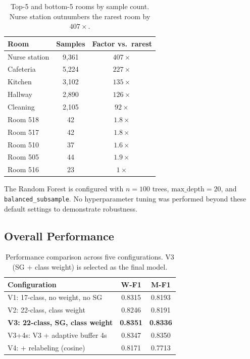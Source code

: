 \documentclass{iopconfser}
\begin{document}
\begin{table}[h]
\centering
\caption{Top-5 and bottom-5 rooms by sample count. Nurse station outnumbers the rarest room by $407\times$.}
\label{tab:imbalance}
\begin{tabular}{lcc}
\toprule
\textbf{Room} & \textbf{Samples} & \textbf{Factor vs.\ rarest} \\
\midrule
Nurse station & 9,361 & $407\times$ \\
Cafeteria     & 5,224 & $227\times$ \\
Kitchen       & 3,102 & $135\times$ \\
Hallway       & 2,890 & $126\times$ \\
Cleaning      & 2,105 & $92\times$  \\
\addlinespace
Room 518      & 42    & $1.8\times$ \\
Room 517      & 42    & $1.8\times$ \\
Room 510      & 37    & $1.6\times$ \\
Room 505      & 44    & $1.9\times$ \\
Room 516      & 23    & $1\times$   \\
\bottomrule
\end{tabular}
\end{table}

The Random Forest is configured with $n = 100$ trees, $\text{max\_depth} = 20$, and \texttt{balanced\_subsample}. No hyperparameter tuning was performed beyond these default settings to demonstrate robustness.

\subsection{Overall Performance}

\begin{table}[h]
\centering
\caption{Performance comparison across five configurations. V3 (SG + class weight) is selected as the final model.}
\label{tab:results}
\begin{tabular}{lcc}
\toprule
\textbf{Configuration} & \textbf{W-F1} & \textbf{M-F1} \\
\midrule
V1: 17-class, no weight, no SG   & 0.8315 & 0.8193 \\
V2: 22-class, class weight       & 0.8246 & 0.8191 \\
\textbf{V3: 22-class, SG, class weight} & \textbf{0.8351} & \textbf{0.8336} \\
V3+4s: V3 + adaptive buffer 4s   & 0.8347 & 0.8350 \\
V4: + relabeling (cosine)        & 0.8171 & 0.7713 \\
\bottomrule
\end{tabular}
\end{table}
\end{document}
